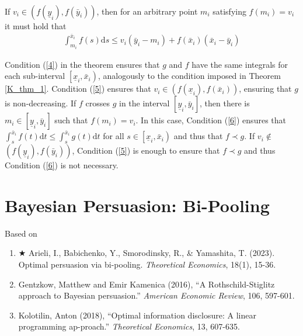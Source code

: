 \documentclass[11pt]{elegantbook}
\begin{document}
\begin{theorem}
\begin{equation}
\begin{aligned}
        \end{aligned}
        \label{5}
    \end{equation}
    If $v_i \in\left(f\left(\underline{y}_i\right), f\left(\bar{y}_i\right)\right)$, then for an arbitrary point $m_i$ satisfying $f\left(m_i\right)=v_i$ it must hold that
    \begin{equation}
        \begin{aligned}
            \int_{m_i}^{\bar{x}_i} f(s) \mathrm{d} s \leq v_i\left(\bar{y}_i-m_i\right)+f\left(\bar{x}_i\right)\left(\bar{x}_i-\bar{y}_i\right)
        \end{aligned}
        \label{6}
    \end{equation}
\end{theorem}
Condition (\ref{4}) in the theorem ensures that $g$ and $f$ have the same integrals for each sub-interval $\left[\underline{x}_i, \bar{x}_i\right)$, analogously to the condition imposed in Theorem \ref{K_thm_1}. Condition (\ref{5}) ensures that $v_i \in\left(f\left(\underline{x}_i\right), f\left(\bar{x}_i\right)\right)$, ensuring that $g$ is non-decreasing. If $f$ crosses $g$ in the interval $\left[\underline{y}_i, \bar{y}_i\right]$, then there is $m_i \in\left[\underline{y}_i, \bar{y}_i\right]$ such that $f\left(m_i\right)=v_i$. In this case, Condition (\ref{6}) ensures that $\int_s^{\bar{x}_i} f(t) \mathrm{d} t \leq \int_s^{\bar{x}_i} g(t) \mathrm{d} t$ for all $s \in\left[\underline{x}_i, \bar{x}_i\right)$ and thus that $f \prec g$. If $v_i \notin$ $\left(f\left(\underline{y}_i\right), f\left(\bar{y}_i\right)\right)$, Condition (\ref{5}) is enough to ensure that $f \prec g$ and thus Condition (\ref{6}) is not necessary.





\chapter{Bayesian Persuasion: Bi-Pooling}
Based on
\begin{enumerate}[$\circ$]
    \item $\bigstar$ Arieli, I., Babichenko, Y., Smorodinsky, R., \& Yamashita, T. (2023). Optimal persuasion via bi-pooling. \textit{Theoretical Economics}, 18(1), 15-36.
    \item Gentzkow, Matthew and Emir Kamenica (2016), “A Rothschild-Stiglitz approach to Bayesian persuasion.” \textit{American Economic Review}, 106, 597-601.
    \item Kolotilin, Anton (2018), “Optimal information disclosure: A linear programming ap-proach.” \textit{Theoretical Economics}, 13, 607-635.
\end{enumerate}
\end{document}
